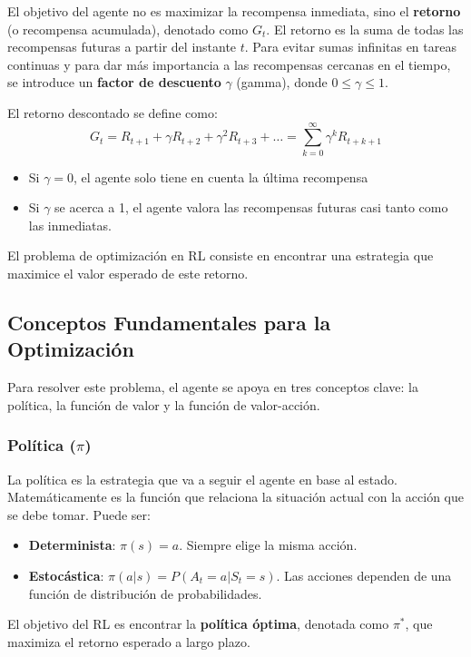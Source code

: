 \documentclass[12pt,a4paper]{book}
\begin{document}
El objetivo del agente no es maximizar la recompensa inmediata, sino el \textbf{retorno} (o recompensa acumulada), denotado como $G_t$. El retorno es la suma de todas las recompensas futuras a partir del instante $t$. Para evitar sumas infinitas en tareas continuas y para dar más importancia a las recompensas cercanas en el tiempo, se introduce un \textbf{factor de descuento} $\gamma$ (gamma), donde $0 \le \gamma \le 1$.

El retorno descontado se define como:
\[ G_t = R_{t+1} + \gamma R_{t+2} + \gamma^2 R_{t+3} + \dots = \sum_{k=0}^{\infty} \gamma^k R_{t+k+1} \]

\begin{itemize}
    \item Si $\gamma = 0$, el agente solo tiene en cuenta la última recompensa
    \item Si $\gamma$ se acerca a 1, el agente valora las recompensas futuras casi tanto como las inmediatas.
\end{itemize}

El problema de optimización en RL consiste en encontrar una estrategia que maximice el valor esperado de este retorno.

\subsection{Conceptos Fundamentales para la Optimización}

Para resolver este problema, el agente se apoya en tres conceptos clave: la política, la función de valor y la función de valor-acción.

\subsubsection{Política ($\pi$)}
La política es la estrategia que va a seguir el agente en base al estado. Matemáticamente es la función que relaciona la situación actual con la acción que se debe tomar. Puede ser:
\begin{itemize}
    \item \textbf{Determinista}: $\pi(s) = a$. Siempre elige la misma acción.
    \item \textbf{Estocástica}: $\pi(a|s) = P(A_t = a | S_t = s)$. Las acciones dependen de una función de distribución de probabilidades.
\end{itemize}
El objetivo del RL es encontrar la \textbf{política óptima}, denotada como $\pi^*$, que maximiza el retorno esperado a largo plazo.
\end{document}
